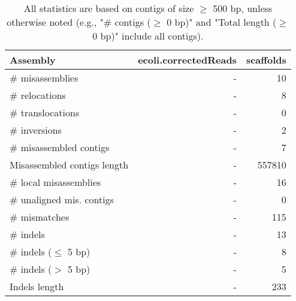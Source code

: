\documentclass[12pt,a4paper]{article}
\begin{document}
\begin{table}[ht]
\begin{center}
\caption{All statistics are based on contigs of size $\geq$ 500 bp, unless otherwise noted (e.g., "\# contigs ($\geq$ 0 bp)" and "Total length ($\geq$ 0 bp)" include all contigs).}
\begin{tabular}{|l*{2}{|r}|}
\hline
Assembly & ecoli.correctedReads & scaffolds \\ \hline
\# misassemblies & - & 10 \\ \hline
\hspace{5mm}\# relocations & - & 8 \\ \hline
\hspace{5mm}\# translocations & - & 0 \\ \hline
\hspace{5mm}\# inversions & - & 2 \\ \hline
\# misassembled contigs & - & 7 \\ \hline
Misassembled contigs length & - & 557810 \\ \hline
\# local misassemblies & - & 16 \\ \hline
\# unaligned mis. contigs & - & 0 \\ \hline
\# mismatches & - & 115 \\ \hline
\# indels & - & 13 \\ \hline
\hspace{5mm}\# indels ($\leq$ 5 bp) & - & 8 \\ \hline
\hspace{5mm}\# indels ($>$ 5 bp) & - & 5 \\ \hline
Indels length & - & 233 \\ \hline
\end{tabular}
\end{center}
\end{table}
\end{document}

